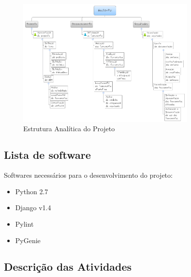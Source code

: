
\begin{figure}[h]
	\label{eap}
	\centering
	\includegraphics[width=0.8\textwidth]{conteudo/EAP}
	\caption{Estrutura Analítica do Projeto}
\end{figure}


\subsection{Lista de software} %
\label{sub:lista_de_software}

Softwares necessários para o desenvolvimento do projeto:
\begin{itemize}
	\item Python 2.7
	\item Django v1.4
	\item Pylint
	\item PyGenie
\end{itemize}


\subsection{Descrição das Atividades} %
\label{sub:descri_o_das_atividades}

